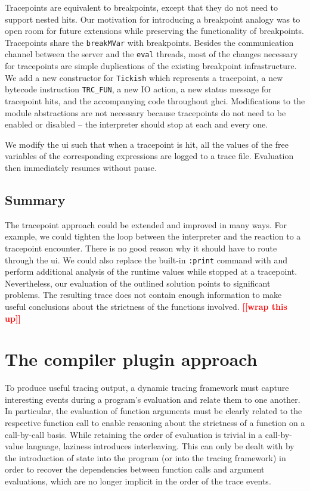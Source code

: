 \documentclass[thesis=B,english]{FITthesis}[2019/12/23]
\newcommand{\todo}[1]{\textcolor{red}{\textbf{[[#1]]}}}
\newcommand{\hsType}[1]{\texttt{#1}}
\newcommand{\hsIdent}[1]{\texttt{#1}}
\begin{document}
Tracepoints are equivalent to breakpoints, except that they do not need to
support nested hits. Our motivation for introducing a breakpoint analogy was to
open room for future extensions while preserving the functionality of
breakpoints. Tracepoints share the \hsIdent{breakMVar} with breakpoints.
Besides the communication channel between the server and the \texttt{eval}
threads, most of the changes necessary for tracepoints are simple duplications
of the existing breakpoint infrastructure.  We add a new constructor for
\hsType{Tickish} which represents a tracepoint, a new bytecode instruction
\texttt{TRC\_FUN}, a new IO action, a new status message for tracepoint hits,
and the accompanying code throughout \acrshort{ghci}. Modifications to the
module abstractions are not necessary because tracepoints do not need to be
enabled or disabled -- the interpreter should stop at each and every one.

We modify the \acrshort{ui} such that when a tracepoint is hit, all the values
of the free variables of the corresponding expressions are logged to a trace
file. Evaluation then immediately resumes without pause.

\subsection*{Summary}
The tracepoint approach could be extended and improved in many ways. For
example, we could tighten the loop between the interpreter and the reaction to
a tracepoint encounter. There is no good reason why it should have to route
through the \acrshort{ui}. We could also replace the built-in \texttt{:print}
command with  and perform additional analysis of the
runtime values while stopped at a tracepoint. Nevertheless, our evaluation of
the outlined solution points to significant problems. The resulting trace does
not contain enough information to make useful conclusions about the strictness
of the functions involved. \todo{wrap this up}


\section{The compiler plugin approach}
To produce useful tracing output, a dynamic tracing framework must capture
interesting events during a program's evaluation and relate them to one
another. In particular, the evaluation of function arguments must be clearly
related to the respective function call to enable reasoning about the
strictness of a function on a call-by-call basis. While retaining the order of
evaluation is trivial in a call-by-value language, laziness introduces
interleaving. This can only be dealt with by the introduction of state into the
program (or into the tracing framework) in order to recover the dependencies
between function calls and argument evaluations, which are no longer implicit
in the order of the trace events.
\end{document}
